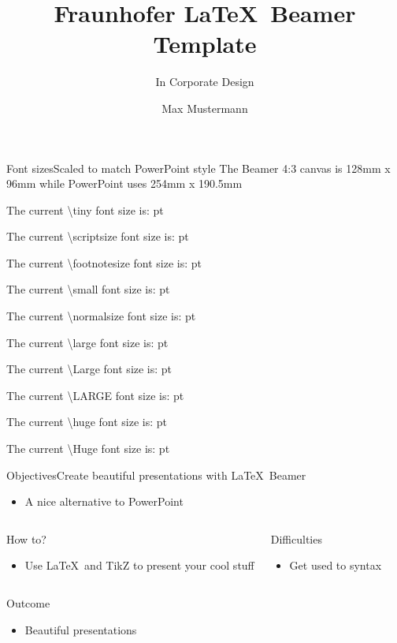 \documentclass{fhgbeamer169}
\title{Fraunhofer \LaTeX~Beamer Template}
\subtitle{In Corporate Design}
\author[Mustermann]{Max Mustermann}
\institute[Fraunhofer Institute] %
{%
  Fraunhofer Institute
}
\makeatletter
\newcommand\thefontsize[2]{{#1 The current \textbackslash #2 font size is: \f@size pt\par}}
\makeatother
\begin{document}
\frame{\titlepage}

\begin{frame}{Font sizes}{Scaled to match PowerPoint style}
The Beamer 4:3 canvas is 128mm x 96mm while PowerPoint uses 254mm x 190.5mm\\[1\baselineskip]
\thefontsize\tiny{tiny}
\thefontsize\scriptsize{scriptsize}
\thefontsize\footnotesize{footnotesize}
\thefontsize\small{small}
\thefontsize\normalsize{normalsize}
\thefontsize\large{large}
\thefontsize\Large{Large}
\thefontsize\LARGE{LARGE}
\thefontsize\huge{huge}
\thefontsize\Huge{Huge}
\end{frame}

\begin{frame}{Objectives}{Create beautiful presentations with \LaTeX~Beamer}
\begin{itemize}
\item A nice alternative to PowerPoint
\end{itemize}
\begin{columns}[onlytextwidth]
\begin{exampleblock}{How to?}
\begin{itemize}
    \item Use \LaTeX~and TikZ to present your cool stuff
\end{itemize}
\end{exampleblock}
\begin{alertblock}{Difficulties}
\begin{itemize}
    \item Get used to syntax
\end{itemize}
\end{alertblock}
\end{columns}
\pause
\begin{block}{Outcome}
\begin{itemize}
    \item Beautiful presentations
\end{itemize}
\end{block}
\end{frame}
\end{document}
